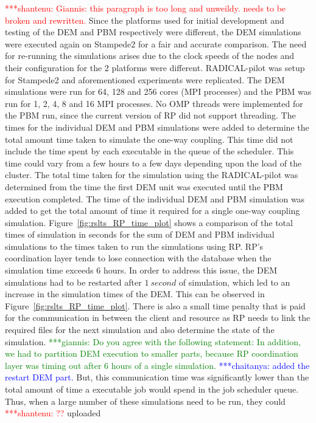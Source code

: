 \documentclass[preprint,11pt,authoryear]{elsarticle}
\newcommand{\jhanote}[1]{ {\textcolor{red} { ***shantenu: #1 }}}
\newcommand{\csnote}[1]{ {\textcolor{blue} { ***chaitanya: #1 }}}
\newcommand{\gpnote}[1]{{\textcolor{green} {***giannis: #1}}}
\newcommand{\jhanote}[1]{ {\textcolor{red} { ***shantenu: #1 }}}
\newcommand{\csnote}[1]{}
\newcommand{\gpnote}[1]{}
\begin{document}
\jhanote{Giannis: this paragraph is too long and unweildy. needs to be broken and rewritten.}
Since the platforms used for initial development and testing of the DEM and
PBM respectively were different, the DEM simulations were executed again on
Stampede2 for a fair and accurate comparison. The need for re-running the
simulations arises due to the clock speeds of the nodes and their
configuration for the 2 platforms were different. RADICAL-pilot was setup
for Stampede2 and aforementioned experiments were replicated. The DEM
simulations were run for 64, 128 and 256 cores (MPI processes) and the PBM was
run for 1, 2, 4, 8 and 16 MPI processes. No OMP threads were implemented for
the PBM run, since the current version of RP did not support threading. The
times for the individual DEM and PBM simulations were added to determine the
total amount time taken to simulate the one-way coupling. This time did not
include the time spent by each executable in the queue of the scheduler. This
time could vary from a few hours to a few days depending upon the load of the
cluster. The total time taken for the simulation using the RADICAL-pilot was
determined from the time the first DEM unit was executed until the PBM
execution completed. The time of the individual DEM and PBM simulation was
added to get the total amount of time it required for a single one-way
coupling simulation. Figure~\ref{fig:rslts_RP_time_plot} shows a comparison of
the total times of simulation in seconds for the sum of DEM and PBM individual
simulations to the times taken to run the simulations using RP. RP's
coordination layer tends to lose connection with the database when the
simulation time exceeds 6 hours. In order to address this issue, the DEM
simulations had to be restarted after $1~second$ of simulation, which led to
an increase in the simulation times of the DEM. This can be observed in
Figure~\ref{fig:rslts_RP_time_plot}. There is also a small time penalty that
is paid for the communication in between the client and resource as RP needs
to link the required files for the next simulation and also determine the
state of the simulation.
 \gpnote{Do you agree with the following statement:
In addition, we had to partition DEM execution to smaller parts, because RP coordination
layer was timing out after 6 hours of a single simulation.} \csnote{added the restart DEM part.}
 But, this communication time was significantly lower than the total
amount of time a executable job would spend in the job scheduler queue.
Thus, when a large number of these simulations need to be run, they could \jhanote{??} uploaded 
\end{document}
